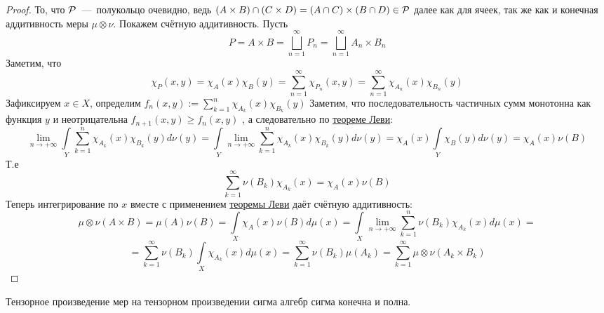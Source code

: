\begin{proof}
    То, что  $\mathcal{P}$~---~полукольцо очевидно, ведь $(A \times B) \cap (C \times D) = (A \cap C) \times (B \cap D) \in \mathcal{P}$ далее как для ячеек, так же как и конечная аддитивность меры $\mu \otimes \nu$. Покажем счётную аддитивность. Пусть \[P = A \times B = \bigsqcup\limits_{n = 1}^\infty P_n= \bigsqcup\limits_{n = 1}^\infty A_n \times B_n\]
    Заметим, что \[\chi_{P}(x, y) = \chi_A(x)\chi_B(y) = \sum\limits_{n = 1}^\infty \chi_{P_n}(x, y) = \sum\limits_{n = 1}^\infty \chi_{A_n}(x)\chi_{B_n}(y)\]
    Зафиксируем $x \in X$, определим $f_n (x, y) := \sum\limits_{k = 1}^n \chi_{A_k}(x)\chi_{B_k}(y)$
    Заметим, что последовательность частичных сумм монотонна как функция $y$ и неотрицательна $f_{n+1}(x, y) \geq f_n(x, y)$ , а следовательно по \hyperlink{beppo_levi}{теореме Леви}: \[\lim\limits_{n \rightarrow +\infty} \int\limits_{Y} \sum\limits_{k = 1}^n \chi_{A_k}(x)\chi_{B_k}(y)d\nu(y) = \int\limits_Y \lim\limits_{n \rightarrow +\infty} \sum\limits_{k = 1}^n \chi_{A_k}(x)\chi_{B_k}(y)d\nu(y) = \chi_A(x)\int\limits_Y \chi_B(y)d\nu(y) = \chi_A(x)\nu(B)\]
    Т.е \[\sum\limits_{k = 1}^\infty \nu(B_k)\chi_{A_k}(x) = \chi_A(x)\nu(B)\]
    Теперь интегрирование по $x$ вместе с применением \hyperlink{beppo_levi}{теоремы Леви} даёт счётную аддитивность: \[\mu\otimes\nu(A \times B) =  \mu(A)\nu(B) = \int\limits_{X}\chi_A(x)\nu(B)d\mu(x) = \int\limits_X \lim\limits_{n \rightarrow +\infty}\sum\limits_{k = 1}^n\nu(B_k)\chi_{A_k}(x)d\mu(x) = \]\[ = \sum\limits_{k = 1}^\infty \nu(B_k) \int\limits_X \chi_{A_k}(x)d\mu(x) = \sum\limits_{k = 1}^\infty \nu(B_k)\mu(A_k) = \sum\limits_{k = 1}^\infty \mu\otimes\nu(A_k \times B_k)\]
\end{proof}
\begin{note}
    Тензорное произведение мер на тензорном произведении сигма алгебр сигма конечна и полна.
\end{note}

